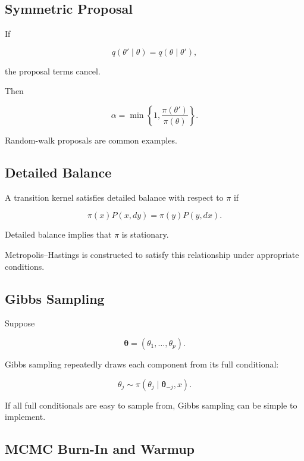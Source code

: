 \subsection{Symmetric Proposal}
\label{subsec:symmetric-mh-proposal}

If

\[
q
(
\theta'\mid\theta
)
=
q
(
\theta\mid\theta'
),
\]

the proposal terms cancel.

Then

\[
\boxed{
\alpha
=
\min
\left\{
1,
\frac{
\pi(\theta')
}{
\pi(\theta)
}
\right\}.
}
\]

Random-walk proposals are common examples.

\subsection{Detailed Balance}
\label{subsec:detailed-balance}

A transition kernel satisfies detailed balance with respect to \(\pi\) if

\[
\boxed{
\pi(x)
P(x,dy)
=
\pi(y)
P(y,dx).
}
\]

Detailed balance implies that \(\pi\) is stationary.

Metropolis--Hastings is constructed to satisfy this relationship under
appropriate conditions.

\subsection{Gibbs Sampling}
\label{subsec:gibbs-sampling-computational}

Suppose

\[
\boldsymbol{\theta}
=
(
\theta_1,\ldots,\theta_p
).
\]

Gibbs sampling repeatedly draws each component from its full conditional:

\[
\boxed{
\theta_j
\sim
\pi
(
\theta_j
\mid
\boldsymbol{\theta}_{-j},
x
).
}
\]

If all full conditionals are easy to sample from, Gibbs sampling can be
simple to implement.

\subsection{MCMC Burn-In and Warmup}
\label{subsec:mcmc-burnin-computational}


